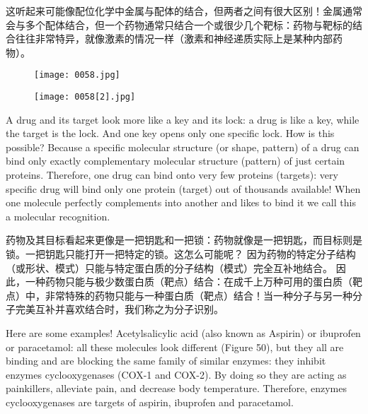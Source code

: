 \documentclass[dvipsnames, svgnames,a4paper,11pt]{article}
\begin{document}
这听起来可能像配位化学中金属与配体的结合，但两者之间有很大区别！金属通常会与多个配体结合，但一个药物通常只结合一个或很少几个靶标：药物与靶标的结合往往非常特异，就像激素的情况一样（激素和神经递质实际上是某种内部药物）。

\begin{figure}[ht]
    \centering
    \texttt{[image: 0058.jpg]}
     \label{fig48}
\end{figure}

\begin{figure}[ht]
    \centering
    \texttt{[image: 0058[2].jpg]}
     \label{fig49}
\end{figure}

A drug and its target look more like a key and its lock: a drug is like a key, while the target is the lock. And one key opens only one specific lock. How is this possible? Because a specific molecular structure (or shape, pattern) of a drug can bind only exactly complementary molecular structure (pattern) of just certain proteins. Therefore, one drug can bind onto very few proteins (targets): very specific drug will bind only one protein (target) out of thousands available! When one molecule perfectly complements into another and likes to bind it we call this a molecular recognition.

药物及其目标看起来更像是一把钥匙和一把锁：药物就像是一把钥匙，而目标则是锁。一把钥匙只能打开一把特定的锁。这怎么可能呢？ 因为药物的特定分子结构（或形状、模式）只能与特定蛋白质的分子结构（模式）完全互补地结合。 因此，一种药物只能与极少数蛋白质（靶点）结合：在成千上万种可用的蛋白质（靶点）中，非常特殊的药物只能与一种蛋白质（靶点）结合！当一种分子与另一种分子完美互补并喜欢结合时，我们称之为分子识别。

Here are some examples! Acetylsalicylic acid (also known as Aspirin) or ibuprofen or paracetamol: all these molecules look different (Figure 50), but they all are binding and are blocking the same family of similar enzymes: they inhibit enzymes cyclooxygenases (COX-1 and COX-2). By doing so they are acting as painkillers, alleviate pain, and decrease body temperature. Therefore, enzymes cyclooxygenases are targets of aspirin, ibuprofen and paracetamol.
\end{document}
